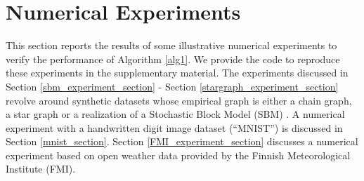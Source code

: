\documentclass[lettersize,journal]{IEEEtran}
\begin{document}



\section{Numerical Experiments}
\label{sec_numexp}

This section reports the results of some illustrative numerical experiments to verify the performance 
of Algorithm \ref{alg1}. We provide the code to reproduce these experiments in the supplementary 
material. The experiments discussed in Section \ref{sbm_experiment_section} - Section \ref{stargraph_experiment_section} 
revolve around synthetic datasets whose empirical graph is either a chain graph, a star graph 
or a realization of a Stochastic Block Model (SBM) \cite{AbbeSBM2018}. A numerical experiment with a handwritten digit 
image dataset (``MNIST'') is discussed in Section \ref{mnist_section}. Section \ref{FMI_experiment_section} 
discusses a numerical experiment based on open weather data provided by the Finnish Meteorological Institute (FMI). 
\end{document}
